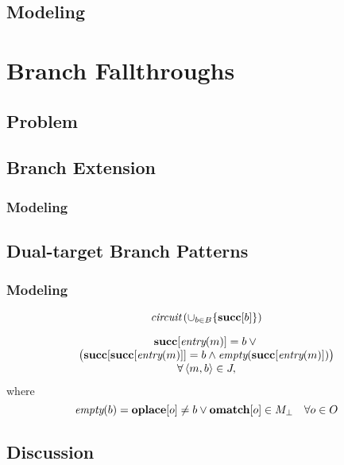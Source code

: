 \subsection{Modeling}

\section{Branch Fallthroughs}
\subsection{Problem}
\subsection{Branch Extension}
\subsubsection{Modeling}
\subsection{Dual-target Branch Patterns}
\subsubsection{Modeling}

\begin{equation}
  \mCircuit\left(
    \cup_{b \in \mBlockSet} \{\mVar{succ}[b]\}
  \right)
  \labelEquation{block-order}
\end{equation}

\begin{equation}
  \begin{array}{c}
    \mVar{succ}[\mEntry(m)] = b \mOr \mbox{} \\
    \big(
      \mVar{succ}[\mVar{succ}[\mEntry(m)]] = b
      \mAnd
      \mEmptyBlock(\mVar{succ}[\mEntry(m)])
    \big) \\
    \forall \mTuple{m}{b} \in \mFallThroughSet,
  \end{array}
  \labelEquation{fall-through}
\end{equation}
%
where
%
\begin{equation*}
  \mEmptyBlock(b) =
  \mVar{oplace}[o] \neq b
  \mOr
  \mVar{omatch}[o] \in \mMatchSet[\mNull]
  \mQuantSep
  \forall o \in \mOpSet
\end{equation*}

\subsection{Discussion}

